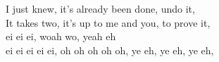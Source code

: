 I just knew, it's already been done, undo it, \\
It takes two, it's up to me and you, to prove it, \\
ei ei ei, woah wo, yeah eh \\
ei ei ei ei ei, oh oh oh oh oh, ye eh, ye eh, ye eh,